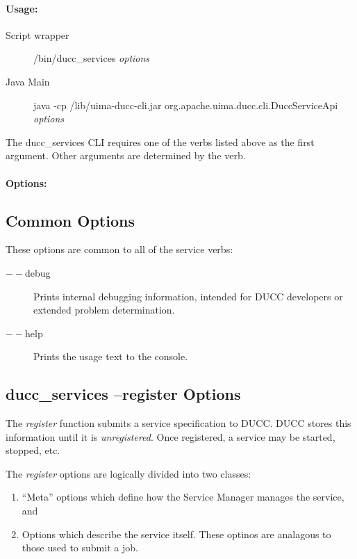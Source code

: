     \paragraph{Usage:}
       \begin{description}
          \item[Script wrapper] \ducchome/bin/ducc\_services {\em options}
          \item[Java Main]      java -cp \ducchome/lib/uima-ducc-cli.jar org.apache.uima.ducc.cli.DuccServiceApi {\em options}
          \end{description}
          
          The ducc\_services CLI requires one of the verbs listed above as the first argument. Other arguments are determined
          by the verb.

    \paragraph{Options:}

    \subsection{Common Options}
        These options are common to all of the service verbs:
        \begin{description}
           \item[$--$debug ]          
             Prints internal debugging information, intended for DUCC developers or extended problem determination.                    
           \item[$--$help]
             Prints the usage text to the console. 
        \end{description}
        
    \subsection{ducc\_services --register Options}
    \label{subsec:cli.ducc-services.register}
       The {\em register} function submits a service specification to DUCC.  DUCC stores this 
       information until it is {\em unregistered}.  Once registered, a service may be
       started, stopped, etc.

       The {\em register} options are logically divided into two classes:
       \begin{enumerate}
         \item ``Meta'' options which define how the Service Manager manages the service, and
         \item Options which describe the service itself.  These optinos are analagous to
           those used to submit a job.
       \end{enumerate}

